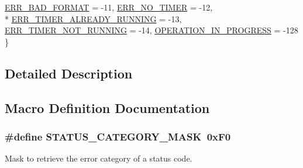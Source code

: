 \begin{DoxyCompactItemize}
\hyperlink{group__group__sam0__utils__status__codes_gga29235ed38b6f02861f29daae665ac3a2aacb8e19f1a844f9dcef8448afaddc01f}{E\+R\+R\+\_\+\+B\+A\+D\+\_\+\+F\+O\+R\+M\+A\+T} = -\/11, 
\hyperlink{group__group__sam0__utils__status__codes_gga29235ed38b6f02861f29daae665ac3a2a6d0a40d6d1356ffebe4fc22ec41b267f}{E\+R\+R\+\_\+\+N\+O\+\_\+\+T\+I\+M\+E\+R} = -\/12, 
\\*
\hyperlink{group__group__sam0__utils__status__codes_gga29235ed38b6f02861f29daae665ac3a2affb72bf05bbe079b38c284796cf3e746}{E\+R\+R\+\_\+\+T\+I\+M\+E\+R\+\_\+\+A\+L\+R\+E\+A\+D\+Y\+\_\+\+R\+U\+N\+N\+I\+N\+G} = -\/13, 
\hyperlink{group__group__sam0__utils__status__codes_gga29235ed38b6f02861f29daae665ac3a2a2119391dfc2668780bfd41a25426c32d}{E\+R\+R\+\_\+\+T\+I\+M\+E\+R\+\_\+\+N\+O\+T\+\_\+\+R\+U\+N\+N\+I\+N\+G} = -\/14, 
\hyperlink{group__group__sam0__utils__status__codes_gga29235ed38b6f02861f29daae665ac3a2a9b25aed7ac4ef4fc3c7250543bb113c0}{O\+P\+E\+R\+A\+T\+I\+O\+N\+\_\+\+I\+N\+\_\+\+P\+R\+O\+G\+R\+E\+S\+S} = -\/128
 \}
\end{DoxyCompactItemize}


\subsection{Detailed Description}


\subsection{Macro Definition Documentation}
\hypertarget{group__group__sam0__utils__status__codes_ga5bf938a904077896054cd093bf7d8fa8}{}
\subsubsection[{S\+T\+A\+T\+U\+S\+\_\+\+C\+A\+T\+E\+G\+O\+R\+Y\+\_\+\+M\+A\+S\+K}]{\setlength{\rightskip}{0pt plus 5cm}\#define S\+T\+A\+T\+U\+S\+\_\+\+C\+A\+T\+E\+G\+O\+R\+Y\+\_\+\+M\+A\+S\+K~0x\+F0}\label{group__group__sam0__utils__status__codes_ga5bf938a904077896054cd093bf7d8fa8}
Mask to retrieve the error category of a status code. \hypertarget{group__group__sam0__utils__status__codes_ga4c46d8f176ca46ab775db0fe270d2f98}{}
